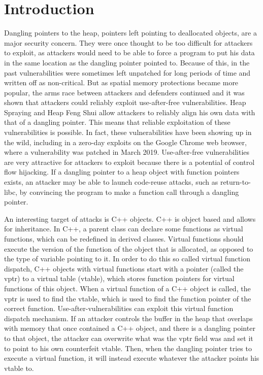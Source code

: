 \documentclass[conference]{IEEEtran}
\begin{document}
\section{Introduction}
Dangling pointers to the heap, pointers left pointing to deallocated objects, 
are a major security concern. They were once thought to be too difficult for 
attackers to exploit, as attackers would need to be able to force a program 
to put his data in the same location as the dangling pointer pointed to. 
Because of this, in the past vulnerabilities were sometimes left unpatched 
for long periods of time and written off as non-critical. But as spatial 
memory protections became more popular, the arms race between attackers and 
defenders continued and it was shown that attackers could reliably exploit 
use-after-free vulnerabilities. Heap Spraying and Heap Feng Shui allow 
attackers to reliably align his own data with that of a dangling pointer. 
This means that reliable exploitation of these vulnerabilities is possible. 
In fact, these vulnerabilities have been showing up in the wild, including 
in a zero-day exploits on the Google Chrome web browser, where a 
vulnerability was patched in March 2019. Use-after-free vulnerabilities are 
very attractive for attackers to exploit because there is a potential of 
control flow hijacking. If a dangling pointer to a heap object with 
function pointers exists, an attacker may be able to launch code-reuse 
attacks, such as return-to-libc, by convincing the program to make a 
function call through a dangling pointer.  

An interesting target of attacks is C++ objects.  C++ is object based and 
allows for inheritance. In C++, a parent class can declare some functions 
as virtual functions, which can be redefined in derived classes. Virtual 
functions should execute the version of the function of the object that 
is allocated, as opposed to the type of variable pointing to it. In order 
to do this so called virtual function dispatch, C++ objects with virtual 
functions start with a pointer (called the vptr) to a virtual table 
(vtable), which stores function pointers for virtual functions of this 
object. When a virtual function of a C++ object is called, the vptr is 
used to find the vtable, which is used to find the function pointer of 
the correct function. Use-after-vulnerabilities can exploit this virtual 
function dispatch mechanism. If an attacker controls the buffer in the 
heap that overlaps with memory that once contained a C++ object, and 
there is a dangling pointer to that object, the attacker can overwrite 
what was the vptr field was and set it to point to his own counterfeit 
vtable. Then, when the dangling pointer tries to execute a virtual 
function, it will instead execute whatever the attacker points his vtable 
to. 
\end{document}
